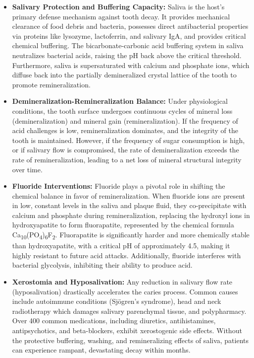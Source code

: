 \begin{itemize}
    \item \textbf{Salivary Protection and Buffering Capacity:} Saliva is the host's primary defense mechanism against tooth decay. It provides mechanical clearance of food debris and bacteria, possesses direct antibacterial properties via proteins like lysozyme, lactoferrin, and salivary IgA, and provides critical chemical buffering. The bicarbonate-carbonic acid buffering system in saliva neutralizes bacterial acids, raising the pH back above the critical threshold. Furthermore, saliva is supersaturated with calcium and phosphate ions, which diffuse back into the partially demineralized crystal lattice of the tooth to promote remineralization.
    \item \textbf{Demineralization-Remineralization Balance:} Under physiological conditions, the tooth surface undergoes continuous cycles of mineral loss (demineralization) and mineral gain (remineralization). If the frequency of acid challenges is low, remineralization dominates, and the integrity of the tooth is maintained. However, if the frequency of sugar consumption is high, or if salivary flow is compromised, the rate of demineralization exceeds the rate of remineralization, leading to a net loss of mineral structural integrity over time.
    \item \textbf{Fluoride Interventions:} Fluoride plays a pivotal role in shifting the chemical balance in favor of remineralization. When fluoride ions are present in low, constant levels in the saliva and plaque fluid, they co-precipitate with calcium and phosphate during remineralization, replacing the hydroxyl ions in hydroxyapatite to form fluorapatite, represented by the chemical formula Ca\textsubscript{10}(PO\textsubscript{4})\textsubscript{6}F\textsubscript{2}. Fluorapatite is significantly harder and more chemically stable than hydroxyapatite, with a critical pH of approximately 4.5, making it highly resistant to future acid attacks. Additionally, fluoride interferes with bacterial glycolysis, inhibiting their ability to produce acid.
    \item \textbf{Xerostomia and Hyposalivation:} Any reduction in salivary flow rate (hyposalivation) drastically accelerates the caries process. Common causes include autoimmune conditions (Sj\"{o}gren's syndrome), head and neck radiotherapy which damages salivary parenchymal tissue, and polypharmacy. Over 400 common medications, including diuretics, antihistamines, antipsychotics, and beta-blockers, exhibit xerostogenic side effects. Without the protective buffering, washing, and remineralizing effects of saliva, patients can experience rampant, devastating decay within months.
\end{itemize}

